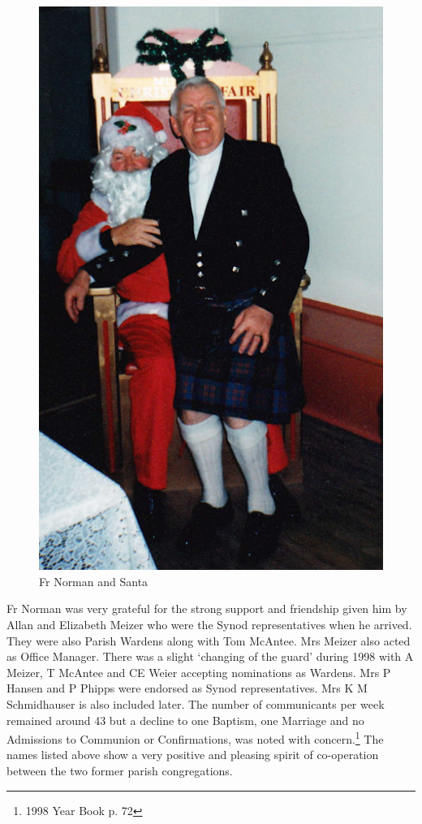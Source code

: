 \begin{figure}
\begin{center}
\includegraphics[width=.7\linewidth,center]{../images/frNormanSanta.png}
\caption{Fr Norman and Santa}
\end{center}
\end{figure}




Fr Norman was very grateful for the strong support and friendship given him by Allan and Elizabeth Meizer who were the Synod representatives when he arrived. They were also Parish Wardens along with Tom McAntee. Mrs Meizer also acted as Office Manager. There was a slight `changing of the guard' during 1998 with A Meizer, T McAntee and CE Weier accepting nominations as Wardens. Mrs P Hansen and P Phipps were endorsed as Synod representatives. Mrs K M Schmidhauser is also included later. The number of communicants per week remained around 43 but a decline to one Baptism, one Marriage and no Admissions to Communion or Confirmations, was noted with concern.\footnote{1998 Year Book p. 72} The names listed above show a very positive and pleasing spirit of co-operation between the two former parish congregations.


